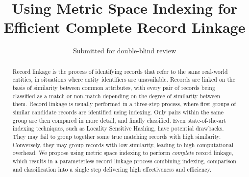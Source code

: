 \documentclass{llncs}
\begin{document}

       
\title{Using Metric Space Indexing for Efficient Complete Record Linkage}

\author{Submitted for double-blind review}

\maketitle


\begin{abstract}
Record linkage is the process of identifying records that refer to the
same real-world entities, in situations where entity identifiers are
unavailable. Records are linked on the basis of similarity between
common attributes, with every pair of records being classified as a
match or non-match depending on the degree of similarity between them.
Record linkage is usually performed in a three-step process, where first
groups of similar candidate records are identified using indexing. Only
pairs within the same group are then compared in more detail, and
finally classified.
%
Even state-of-the-art indexing techniques, such as Locality Sensitive
Hashing, have potential drawbacks. They may fail to group together some
true matching records with high similarity. Conversely, they may group
records with low similarity, leading to high computational overhead.
%
We propose using metric space indexing to perform \emph{complete} record
linkage, which results in a parameterless record linkage process
combining indexing, comparison and classification into a single step
delivering high effectiveness and efficiency.

\end{abstract}
\end{document}
